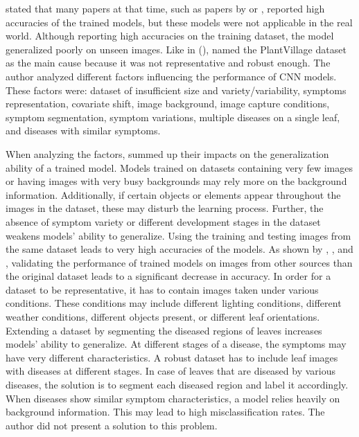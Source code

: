 \documentclass{BachelorBUI}
\begin{document}
        \textcite{Barbedo:2018:2} stated that many papers at that time, such as papers by \textcite{Mohanty:2016} or \textcite{Ferentinos:2018}, reported high accuracies of the trained models, but these models were not applicable in the real world. Although reporting high accuracies on the training dataset, the model generalized poorly on unseen images. Like in (\cite{Barbedo:2018:1}), \textcite{Barbedo:2018:2} named the PlantVillage dataset as the main cause because it was not representative and robust enough. The author analyzed different factors influencing the performance of CNN models. These factors were: dataset of insufficient size and variety/variability, symptoms representation, covariate shift, image background, image capture conditions, symptom segmentation, symptom variations, multiple diseases on a single leaf, and diseases with similar symptoms.

        When analyzing the factors, \textcite{Barbedo:2018:2} summed up their impacts on the generalization ability of a trained model. Models trained on datasets containing very few images or having images with very busy backgrounds may rely more on the background information. Additionally, if certain objects or elements appear throughout the images in the dataset, these may disturb the learning process. Further, the absence of symptom variety or different development stages in the dataset weakens models' ability to generalize. Using the training and testing images from the same dataset leads to very high accuracies of the models. As shown by \textcite{Sladojevic:2016}, \textcite{Mohanty:2016}, and \textcite{Ferentinos:2018}, validating the performance of trained models on images from other sources than the original dataset leads to a significant decrease in accuracy. In order for a dataset to be representative, it has to contain images taken under various conditions. These conditions may include different lighting conditions, different weather conditions, different objects present, or different leaf orientations. Extending a dataset by segmenting the diseased regions of leaves increases models' ability to generalize. At different stages of a disease, the symptoms may have very different characteristics. A robust dataset has to include leaf images with diseases at different stages. In case of leaves that are diseased by various diseases, the solution is to segment each diseased region and label it accordingly. When diseases show similar symptom characteristics, a model relies heavily on background information. This may lead to high misclassification rates. The author did not present a solution to this problem.
\end{document}
